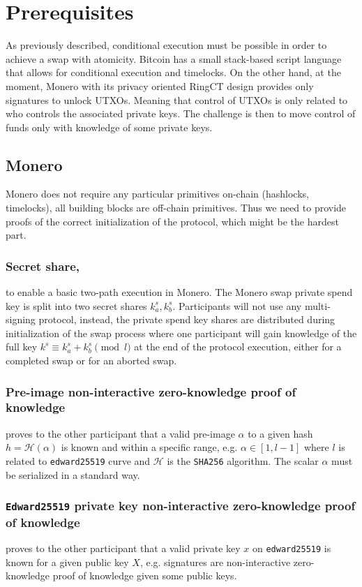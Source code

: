 \documentclass{llncs}
\begin{document}
\section{Prerequisites}
As previously described, conditional execution must be possible in order to achieve a swap with atomicity. Bitcoin has a small stack-based script language that allows for conditional execution and timelocks. On the other hand, at the moment, Monero with its privacy oriented RingCT design provides only signatures to unlock UTXOs. Meaning that control of UTXOs is only related to who controls the associated private keys. The challenge is then to move control of funds only with knowledge of some private keys.

\subsection{Monero}
Monero does not require any particular primitives on-chain (hashlocks, timelocks), all building blocks are off-chain primitives. Thus we need to provide proofs of the correct initialization of the protocol, which might be the hardest part.

\subsubsection{Secret share,}
to enable a basic two-path execution in Monero. The Monero swap private spend key is split into two secret shares $k^s_a, k^s_b$. Participants will not use any multi-signing protocol, instead, the private spend key shares are distributed during initialization of the swap process where one participant will gain knowledge of the full key $k^s \equiv k^s_a + k^s_b \pmod l$ at the end of the protocol execution, either for a completed swap or for an aborted swap.

\subsubsection{Pre-image non-interactive zero-knowledge proof of knowledge}
proves to the other participant that a valid pre-image $\alpha$ to a given hash $h = \mathcal{H}(\alpha)$ is known and within a specific range, e.g. $\alpha \in [1, l-1]$ where $l$ is related to \texttt{edward25519} curve and $\mathcal{H}$ is the \texttt{SHA256} algorithm. The scalar $\alpha$ must be serialized in a standard way.

\subsubsection{\texttt{Edward25519} private key non-interactive zero-knowledge proof of knowledge}
proves to the other participant that a valid private key $x$ on \texttt{edward25519} is known for a given public key $X$, e.g. signatures are non-interactive zero-knowledge proof of knowledge given some public keys.
\end{document}
